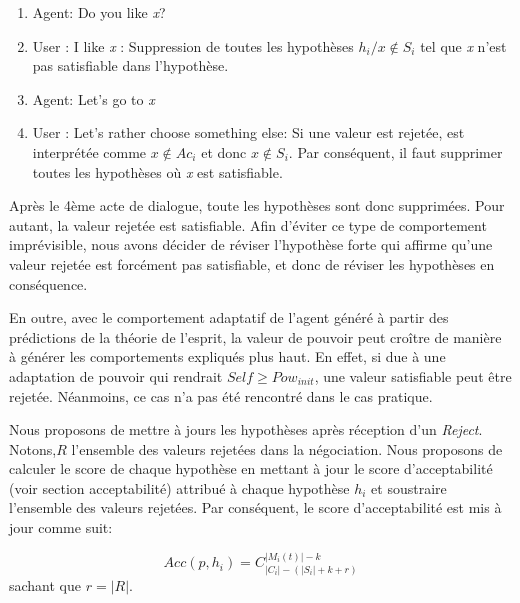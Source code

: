 \documentclass[conference, letterpaper]{article}
\begin{document}
					\begin{enumerate}
						\item	Agent: Do you like \emph{x}?	
						\item	User : I like \emph{x} : Suppression de toutes les hypothèses $h_i / x \notin S_i$ tel que \emph{x} n'est pas satisfiable dans l'hypothèse. 
						\item	Agent: Let's go to \emph{x}
						\item	User : Let's rather choose something else: Si une valeur est rejetée, est interprétée comme $x \notin Ac_i$ et donc $x \notin S_i$.
						Par conséquent, il faut supprimer toutes les hypothèses où \emph{x} est satisfiable. 
					\end{enumerate}
			Après le 4ème acte de dialogue, toute les hypothèses sont donc supprimées. Pour autant, la valeur rejetée est satisfiable. 
			Afin d'éviter ce type de comportement imprévisible, nous avons décider de réviser l'hypothèse forte qui affirme qu'une valeur rejetée est forcément pas satisfiable, et donc de réviser les hypothèses en conséquence. 
		
			En outre, avec le comportement adaptatif de l'agent généré à partir des prédictions de la théorie de l'esprit, la valeur de pouvoir peut croître de  manière à générer les comportements expliqués plus haut. En effet, si due à une adaptation de pouvoir qui rendrait $ Self \geq Pow_{init}$, une valeur satisfiable peut être rejetée. Néanmoins, ce cas n'a pas été rencontré dans le cas pratique. 
			
			Nous proposons de mettre à jours les hypothèses après réception d'un \emph{Reject}.
			Notons,$R$ l'ensemble des valeurs rejetées dans la négociation. Nous proposons de calculer le score de chaque hypothèse en mettant à jour le score d'acceptabilité (voir section acceptabilité) attribué à chaque hypothèse $h_i$ et soustraire l'ensemble des valeurs rejetées.
			Par conséquent, le score d'acceptabilité est mis à jour comme suit:
			
			\begin{equation}
			Acc(p, h_i) = C_{|C_i|-(|S_i| + k + r)}^{|M_i(t)| - k}
			\end{equation}
			sachant que $r = |R|$.
			

	
\end{document}
